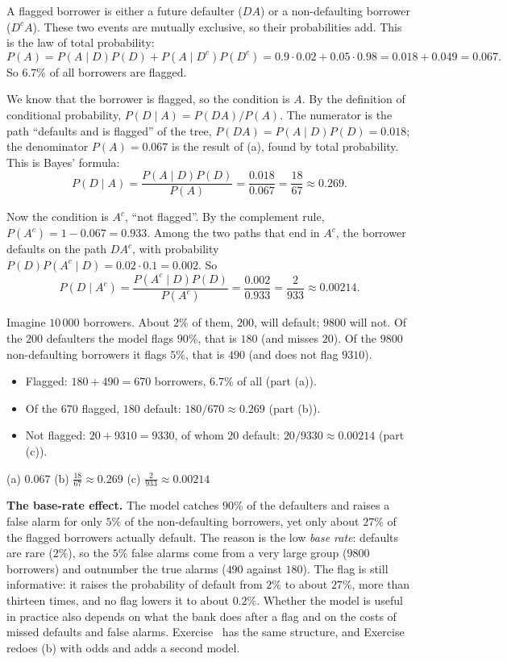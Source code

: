\begin{solution}
	 A flagged borrower is either a future defaulter ($DA$) or a
	non-defaulting borrower ($D^cA$). These two events are mutually exclusive, so their
	probabilities add. This is the law of total probability:
	\[ P(A)=P(A\mid D)P(D)+P(A\mid D^c)P(D^c)
		=0.9\cdot0.02+0.05\cdot0.98=0.018+0.049=0.067. \]
	So $6.7\%$ of all borrowers are flagged.

	 We know that the borrower is flagged, so the condition is $A$.
	By the definition of conditional probability,
	$P(D\mid A)=P(DA)/P(A)$. The numerator is the path ``defaults and is
	flagged'' of the tree, $P(DA)=P(A\mid D)P(D)=0.018$; the denominator
	$P(A)=0.067$ is the result of (a), found by total probability. This is
	Bayes' formula:
	\[ P(D\mid A)=\frac{P(A\mid D)P(D)}{P(A)}
		=\frac{0.018}{0.067}=\frac{18}{67}\approx0.269. \]

	 Now the condition is $A^c$, ``not flagged''. By the complement
	rule, $P(A^c)=1-0.067=0.933$. Among the two paths that end in $A^c$, the
	borrower defaults on the path $DA^c$, with probability
	$P(D)P(A^c\mid D)=0.02\cdot0.1=0.002$. So
	\[ P(D\mid A^c)=\frac{P(A^c\mid D)P(D)}{P(A^c)}=\frac{0.002}{0.933}
		=\frac{2}{933}\approx0.00214. \]

	 Imagine $10\,000$ borrowers. About $2\%$ of
	them, $200$, will default; $9800$ will not. Of the $200$ defaulters the
	model flags $90\%$, that is $180$ (and misses $20$). Of the $9800$
	non-defaulting borrowers it flags $5\%$, that is $490$ (and does not flag $9310$).
	\begin{itemize}[nosep]
		\item Flagged: $180+490=670$ borrowers, $6.7\%$ of all (part (a)).
		\item Of the $670$ flagged, $180$ default: $180/670\approx0.269$
		      (part (b)).
		\item Not flagged: $20+9310=9330$, of whom $20$ default:
		      $20/9330\approx0.00214$ (part (c)).
	\end{itemize}
	\begin{answer}
		(a) $0.067$ \quad (b) $\frac{18}{67}\approx0.269$ \quad
		(c) $\frac{2}{933}\approx0.00214$
	\end{answer}
	\begin{remark}
		\textbf{The base-rate effect.} The model catches $90\%$ of the
		defaulters and raises a false alarm for only $5\%$ of the
		non-defaulting borrowers, yet only about $27\%$ of the flagged borrowers actually
		default. The reason is the low \emph{base rate}: defaults are rare
		($2\%$), so the $5\%$ false alarms come from a very large group ($9800$
		borrowers) and outnumber the true alarms ($490$ against $180$). The flag
		is still informative: it raises the probability of default from $2\%$
		to about $27\%$, more than thirteen times, and no flag lowers it to
		about $0.2\%$. Whether the model is useful in practice also depends on
		what the bank does after a flag and on the costs of missed defaults and
		false alarms. Exercise~ has the same structure, and
		Exercise~ redoes (b) with odds and adds a
		second model.
	\end{remark}
\end{solution}
